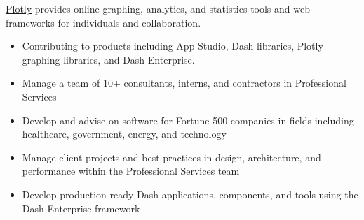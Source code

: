 \documentclass[10pt,ragged2e]{altacv}
\begin{document}
\tagline{}

\begin{fullwidth}
\makecvheader
\end{fullwidth}


\href{https://plotly.com}{Plotly} provides online graphing, analytics, and statistics tools and web frameworks for individuals and collaboration.
\\[8pt]

\begin{itemize}
\item Contributing to products including App Studio, Dash libraries, Plotly graphing libraries, and Dash Enterprise.
\end{itemize}

\divider

\begin{itemize}
\item Manage a team of 10+ consultants, interns, and contractors in Professional Services
\item Develop and advise on software for Fortune 500 companies in fields including healthcare, government, energy, and technology
\end{itemize}

\divider

\begin{itemize}
\item Manage client projects and best practices in design, architecture, and performance within the Professional Services team
\item Develop production-ready Dash applications, components, and tools using the Dash Enterprise framework
\end{itemize}
\end{document}

